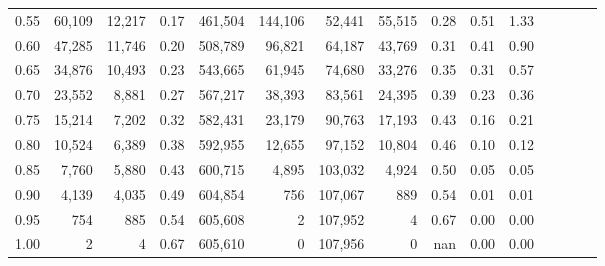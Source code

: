 \begin{tabular}{rrrcrrrrrrrrrrr}
0.55 &  60,109 &  12,217 &                                       0.17 &  461,504 &  144,106 &   52,441 &   55,515 &  0.28 &  0.51 &                         1.33 \\
0.60 &  47,285 &  11,746 &                                       0.20 &  508,789 &   96,821 &   64,187 &   43,769 &  0.31 &  0.41 &                         0.90 \\
0.65 &  34,876 &  10,493 &                                       0.23 &  543,665 &   61,945 &   74,680 &   33,276 &  0.35 &  0.31 &                         0.57 \\
0.70 &  23,552 &   8,881 &                                       0.27 &  567,217 &   38,393 &   83,561 &   24,395 &  0.39 &  0.23 &                         0.36 \\
0.75 &  15,214 &   7,202 &                                       0.32 &  582,431 &   23,179 &   90,763 &   17,193 &  0.43 &  0.16 &                         0.21 \\
0.80 &  10,524 &   6,389 &                                       0.38 &  592,955 &   12,655 &   97,152 &   10,804 &  0.46 &  0.10 &                         0.12 \\
0.85 &   7,760 &   5,880 &                                       0.43 &  600,715 &    4,895 &  103,032 &    4,924 &  0.50 &  0.05 &                         0.05 \\
0.90 &   4,139 &   4,035 &                                       0.49 &  604,854 &      756 &  107,067 &      889 &  0.54 &  0.01 &                         0.01 \\
0.95 &     754 &     885 &                                       0.54 &  605,608 &        2 &  107,952 &        4 &  0.67 &  0.00 &                         0.00 \\
1.00 &       2 &       4 &                                       0.67 &  605,610 &        0 &  107,956 &        0 &   nan &  0.00 &                         0.00 \\
\bottomrule
\end{tabular}
